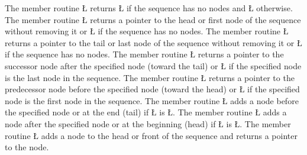 \documentclass[openright,twoside]{report}
\begin{document}
The member routine \LGinlinetrue\LGbegin\lgrinde\L{}\endlgrinde\LGend{} returns \LGinlinetrue\LGbegin\lgrinde\L{}\endlgrinde\LGend{} if the sequence has no nodes and \LGinlinetrue\LGbegin\lgrinde\L{}\endlgrinde\LGend{} otherwise.
The member routine \LGinlinetrue\LGbegin\lgrinde\L{}\endlgrinde\LGend{} returns a pointer to the head or first node of the sequence without removing it or \LGinlinetrue\LGbegin\lgrinde\L{}\endlgrinde\LGend{} if the sequence has no nodes.
The member routine \LGinlinetrue\LGbegin\lgrinde\L{}\endlgrinde\LGend{} returns a pointer to the tail or last node of the sequence without removing it or \LGinlinetrue\LGbegin\lgrinde\L{}\endlgrinde\LGend{} if the sequence has no nodes.
The member routine \LGinlinetrue\LGbegin\lgrinde\L{}\endlgrinde\LGend{} returns a pointer to the successor node after the specified node (toward the tail) or \LGinlinetrue\LGbegin\lgrinde\L{}\endlgrinde\LGend{} if the specified node is the last node in the sequence.
The member routine \LGinlinetrue\LGbegin\lgrinde\L{}\endlgrinde\LGend{} returns a pointer to the predecessor node before the specified node (toward the head) or \LGinlinetrue\LGbegin\lgrinde\L{}\endlgrinde\LGend{} if the specified node is the first node in the sequence.
The member routine \LGinlinetrue\LGbegin\lgrinde\L{}\endlgrinde\LGend{} adds a node before the specified node or at the end (tail) if \LGinlinetrue\LGbegin\lgrinde\L{}\endlgrinde\LGend{} is \LGinlinetrue\LGbegin\lgrinde\L{}\endlgrinde\LGend{}.
The member routine \LGinlinetrue\LGbegin\lgrinde\L{}\endlgrinde\LGend{} adds a node after the specified node or at the beginning (head) if \LGinlinetrue\LGbegin\lgrinde\L{}\endlgrinde\LGend{} is \LGinlinetrue\LGbegin\lgrinde\L{}\endlgrinde\LGend{}.
The member routine \LGinlinetrue\LGbegin\lgrinde\L{}\endlgrinde\LGend{} adds a node to the head or front of the sequence and returns a pointer to the node.
\end{document}
